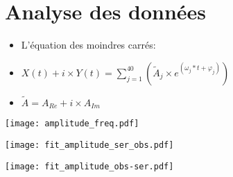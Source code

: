 \section{Analyse des données}

\begin{frame}
	\begin{itemize}
	  \item L'équation des moindres carrés:
      \item $X(t) + i \times Y(t) = \sum\limits_{j=1}^{40} (\widetilde{A}_{j} \times e^{(\omega_{j}*t + \varphi_{j})})$
      \item $\widetilde{A} = A_{Re} + i \times A_{Im}$
	\end{itemize}
\end{frame}

\begin{frame}
	\begin{center}
		\texttt{[image: amplitude\_freq.pdf]}
	\end{center}
\end{frame}

\begin{frame}
	\begin{center}
		\texttt{[image: fit\_amplitude\_ser\_obs.pdf]}
	\end{center} 
\end{frame}

\begin{frame}
	\begin{center}
		\texttt{[image: fit\_amplitude\_obs-ser.pdf]}
	\end{center}
\end{frame}

